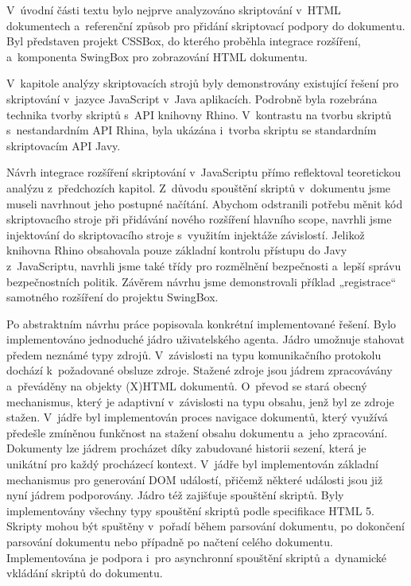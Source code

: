 V~úvodní části textu bylo nejprve analyzováno skriptování v~HTML dokumentech a~referenční způsob pro přidání skriptovací podpory do dokumentu. Byl představen projekt CSSBox, do kterého proběhla integrace rozšíření, a~komponenta SwingBox pro zobrazování HTML dokumentu.

V~kapitole analýzy skriptovacích strojů byly demonstrovány existující řešení pro skriptování v~jazyce JavaScript v~Java aplikacích. Podrobně byla rozebrána technika tvorby skriptů s~API knihovny Rhino. V~kontrastu na tvorbu skriptů s~nestandardním API Rhina, byla ukázána i~tvorba skriptu se standardním skriptovacím API Javy.

Návrh integrace rozšíření skriptování v~JavaScriptu přímo reflektoval teoretickou analýzu z~předchozích kapitol. Z~důvodu spouštění skriptů v~dokumentu jsme museli navrhnout jeho postupné načítání. Abychom odstranili potřebu měnit kód skriptovacího stroje při přidávání nového rozšíření hlavního scope, navrhli jsme injektování do skriptovacího stroje s~využitím injektáže závislostí. Jelikož knihovna Rhino obsahovala pouze základní kontrolu přístupu do Javy z~JavaScriptu, navrhli jsme také třídy pro rozmělnění bezpečnosti a~lepší správu bezpečnostních politik. Závěrem návrhu jsme demonstrovali příklad „registrace“ samotného rozšíření do projektu SwingBox.

Po abstraktním návrhu práce popisovala konkrétní implementované řešení. Bylo implementováno jednoduché jádro uživatelského agenta. Jádro umožnuje stahovat předem neznámé typy zdrojů. V~závislosti na typu komunikačního protokolu dochází k~požadované obsluze zdroje. Stažené zdroje jsou jádrem zpracovávány a~převáděny na objekty (X)HTML dokumentů. O~převod se stará obecný mechanismus, který je adaptivní v~závislosti na typu obsahu, jenž byl ze zdroje stažen. V~jádře byl implementován proces navigace dokumentů, který využívá předešle zmíněnou funkčnost na stažení obsahu dokumentu a~jeho zpracování. Dokumenty lze jádrem procházet díky zabudované historii sezení, která je unikátní pro každý procházecí kontext. V~jádře byl implementován základní mechanismus pro generování DOM událostí, přičemž některé události jsou již nyní jádrem podporovány. Jádro též zajišťuje spouštění skriptů. Byly implementovány všechny typy spouštění skriptů podle specifikace HTML 5. Skripty mohou být spuštěny v~pořadí během parsování dokumentu, po dokončení parsování dokumentu nebo případně po načtení celého dokumentu. Implementována je podpora i~pro asynchronní spouštění skriptů a~dynamické vkládání skriptů do dokumentu.

